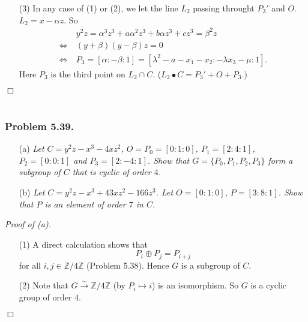 \documentclass{article}
\begin{document}
\begin{enumerate}
\item[(3)]
  In any case of (1) or (2),
  we let the line $L_2$ passing throught $P_3'$ and $O$.
  $L_2 = x - \alpha z$.
  So
  \begin{align*}
    & \:
    y^2 z = \alpha^3 z^3 + a\alpha^2 z^3 + b\alpha z^3 + cz^3 = \beta^2 z \\
    \Longleftrightarrow & \:
    (y + \beta)(y - \beta)z = 0 \\
    \Longleftrightarrow & \:
    P_3 = [\alpha:-\beta:1] = [\lambda^2 - a - x_1 - x_2:-\lambda x_3 - \mu:1].
  \end{align*}
  Here $P_3$ is the third point on $L_2 \cap C$.
  ($L_2 \bullet C = P_3' + O + P_3$.)
\end{enumerate}
$\Box$ \\\\






\subsubsection*{Problem 5.39.}
\begin{enumerate}
\item[(a)]
  \emph{Let $C = y^2z-x^3-4xz^2$, $O = P_0 = [0:1:0]$, $P_1 = [2:4:1]$,
  $P_2 = [0:0:1]$ and $P_3 = [2:-4:1]$.
  Show that $G = \{ P_0, P_1, P_2, P_3 \}$ form a subgroup of $C$ that is cyclic of order $4$.}

\item[(b)]
  \emph{Let $C = y^2z - x^3 + 43xz^2 - 166z^3$. 
  Let $O = [0:1:0]$, $P = [3:8:1]$.
  Show that $P$ is an element of order $7$ in $C$.} \\
\end{enumerate}



\emph{Proof of (a).}
\begin{enumerate}
\item[(1)]
  A direct calculation shows that
  \[
    P_i \oplus P_j = P_{i+j}
  \]
  for all $i, j \in \mathbb{Z}/4\mathbb{Z}$ (Problem 5.38).
  Hence $G$ is a subgroup of $C$.

\item[(2)]
  Note that
  $G \xrightarrow{\sim} \mathbb{Z}/4\mathbb{Z}$ (by $P_i \mapsto i$)
  is an isomorphism.
  So $G$ is a cyclic group of order $4$.
\end{enumerate}
$\Box$ \\
\end{document}
